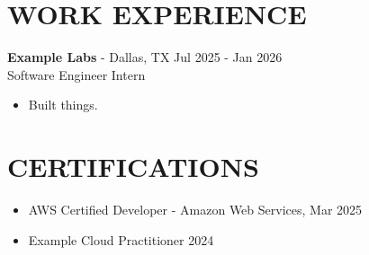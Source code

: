\documentclass[letterpaper,10pt]{article}
\begin{document}
\section*{WORK EXPERIENCE}
\textbf{Example Labs} - Dallas, TX \hfill Jul 2025 - Jan 2026 \\
Software Engineer Intern
\begin{itemize}
    \item Built things.
\end{itemize}
\section*{CERTIFICATIONS}
\begin{itemize}
    \item AWS Certified Developer - Amazon Web Services, Mar 2025
    \item Example Cloud Practitioner \hfill 2024
\end{itemize}
\end{document}
